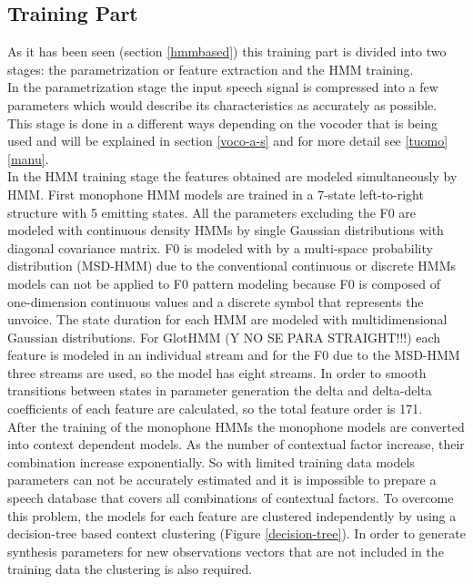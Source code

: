 \subsection{Training Part}\label{tpart} 
As it has been seen (section \ref{hmmbased}) this training part is divided into two stages: the parametrization or feature extraction and the HMM training.\\
In the parametrization stage the input speech signal is compressed into a few parameters which would describe its characteristics as accurately as possible. This stage is done in a different ways depending on the vocoder that is being used and will be explained in section \ref{voco-a-s} and for more detail see \ref{tuomo} \ref{manu}.\\
In the HMM training stage the features obtained are modeled simultaneously by HMM. First monophone HMM models are trained in a 7-state left-to-right structure with 5 emitting states. All the parameters excluding the F0 are modeled with continuous density HMMs by single Gaussian distributions with diagonal covariance matrix. F0 is modeled with by a multi-space probability distribution (MSD-HMM) \cite{introhmmbased} due to the conventional continuous or discrete HMMs models can not be applied to F0 pattern modeling because F0 is composed of one-dimension continuous values and a discrete symbol that represents the unvoice. The state duration for each HMM are modeled with multidimensional Gaussian distributions. For GlotHMM (Y NO SE PARA STRAIGHT!!!) each feature is modeled in an individual stream  and for the F0 due to the MSD-HMM three streams are used, so the model has eight streams. In order to smooth transitions between states in parameter generation the delta and delta-delta coefficients of each feature are calculated, so the total feature order is 171.\\
After the training of the monophone HMMs the monophone models are converted into context dependent models. As the number of contextual factor increase, their combination increase exponentially. So with limited training data models parameters can not be accurately estimated and it is impossible to prepare a speech database that covers all combinations of contextual factors. To overcome this problem, the models for each feature are clustered independently by using a decision-tree based context clustering (Figure \ref{decision-tree}). In order to generate synthesis parameters for new observations vectors that are not included in the training data the clustering is also required.
